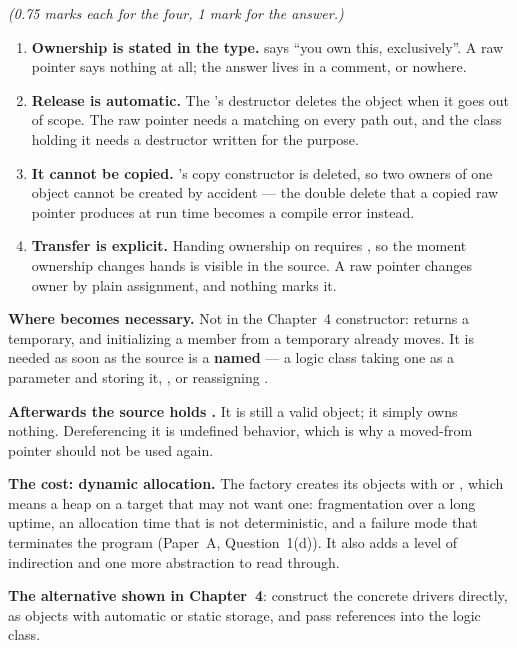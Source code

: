 {\itshape (0.75 marks each for the four, 1 mark for the  answer.)\par}
\begin{enumerate}
  \item \textbf{Ownership is stated in the type.}  says ``you own this,
    exclusively''. A raw pointer says nothing at all; the answer lives in a comment, or nowhere.
  \item \textbf{Release is automatic.} The 's destructor deletes the object when it
    goes out of scope. The raw pointer needs a matching  on every path out, and the
    class holding it needs a destructor written for the purpose.
  \item \textbf{It cannot be copied.} 's copy constructor is deleted, so two
    owners of one object cannot be created by accident --- the double delete that a copied raw
    pointer produces at run time becomes a compile error instead.
  \item \textbf{Transfer is explicit.} Handing ownership on requires , so the moment
    ownership changes hands is visible in the source. A raw pointer changes owner by plain
    assignment, and nothing marks it.
\end{enumerate}

\textbf{Where  becomes necessary.} Not in the Chapter~4 constructor:
\allowbreak{} returns a temporary, and initializing a member from a temporary already
moves. It is needed as soon as the source is a \textbf{named}  --- a logic class
taking one as a parameter and storing it, , or reassigning
.

\textbf{Afterwards the source holds .} It is still a valid object; it simply owns
nothing. Dereferencing it is undefined behavior, which is why a moved-from pointer should not be
used again.

\textbf{The cost: dynamic allocation.} The factory creates its objects with  or
, which means a heap on a target that may not want one: fragmentation over a
long uptime, an allocation time that is not deterministic, and a failure mode that terminates the
program (Paper~A, Question~1(d)). It also adds a level of indirection and one more abstraction to
read through. 

\textbf{The alternative shown in Chapter~4}: construct the concrete drivers directly, as objects
with automatic or static storage, and pass references into the logic class.

